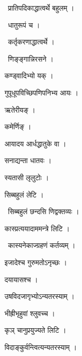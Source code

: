 \documentclass[10pt, openany, oneside]{book}
\begin{document}
\par\noindent\hspace{1.5em}{\vps वा॰}~{\qt प्रातिपदिकाद्धात्वर्थे बहुलम् ।}

\par\noindent\hspace{1.5em}{\vps वा॰}~{\qt धातुरूपं च ।}

\par\noindent\hspace{1.5em}{\vps वा॰}~{\qt कर्तृकरणाद्धात्वर्थे ।}

\par\noindent\hspace{1.5em}{\vps वा॰}~{\qt णिङ्ङ्गान्निरसने ।}

\noindent कण्ड्वादिभ्यो यक् ।

\noindent गुपूधूपविच्छिपणिपनिभ्य आयः ।

\noindent ऋतेरीयङ् ।

\noindent कमेर्णिङ् ।

\noindent आयादय आर्धद्धातुके वा ।

\noindent सनाद्यन्ता धातवः ।

\noindent स्यतासी लृलुटोः ।

\noindent सिब्बहुलं लेटि ।

\par\noindent\hspace{1.5em}{\vps वा॰}~{\qt सिब्बहुलं छन्दसि णिद्वक्तव्यः ।}

\noindent कास्प्रत्ययादाममन्त्रे लिटि ।

\par\noindent\hspace{1.5em}{\vps वा॰}~{\qt कास्यनेकाज्ग्रहणं कर्तव्यम् ।}

\noindent इजादेश्च गुरुमतोऽनृच्छः ।

\noindent दयायासश्च ।

\noindent उषविदजागृभ्योऽन्यतरस्याम् ।

\noindent भीह्रीभृहुवां श्लुवच्च ।

\noindent कृञ् चानुप्रयुज्यते लिटि ।

\noindent विदाङ्कुर्वन्त्वित्यन्यतरस्याम् ।
\end{document}
